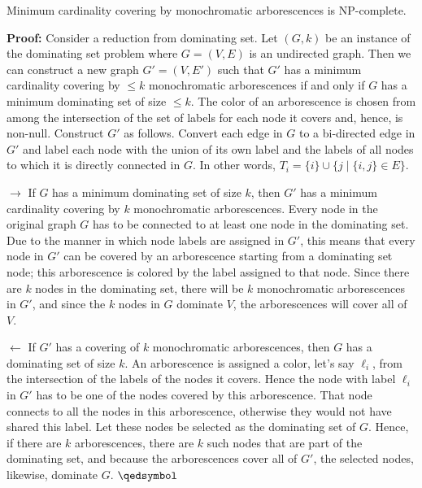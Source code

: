\begin{theorem}
  Minimum cardinality covering by monochromatic arborescences is NP-complete.

\textbf{Proof:} Consider a reduction from dominating set. Let $\left(G, k\right)$ be an instance of the dominating set problem where $G = (V, E)$ is an undirected graph. Then we can construct a new graph $G' = (V, E')$ such that $G'$ has a minimum cardinality covering by $\le k$ monochromatic arborescences if and only if $G$ has a minimum dominating set of size $\le k$. The color of an arborescence is chosen from among the intersection of the set of labels for each node it covers and, hence, is non-null. Construct $G'$ as follows. Convert each edge in $G$ to a bi-directed edge in $G'$ and label each node with the union of its own label and the labels of all nodes to which it is directly connected in $G$. In other words, $T_i = \{i\} \cup \{j \mid \{i,j\} \in E\}$.

$\rightarrow$ If $G$ has a minimum dominating set of size $k$, then $G'$ has a minimum cardinality covering by $k$ monochromatic arborescences. Every node in the original graph $G$ has to be connected to at least one node in the dominating set. Due to the manner in which node labels are assigned in $G'$, this means that every node in $G'$ can be covered by an arborescence starting from a dominating set node; this arborescence is colored by the label assigned to that node. Since there are $k$ nodes in the dominating set, there will be $k$ monochromatic arborescences in $G'$, and since the $k$ nodes in $G$ dominate $V$, the arborescences will cover all of $V$. 

$\leftarrow$ If $G'$ has a covering of $k$ monochromatic arborescences, then $G$ has a dominating set of size $k$. An arborescence is assigned a color, let's say $\ell_i$, from the intersection of the labels of the nodes it covers. Hence the node with label $\ell_i$ in $G'$ has to be one of the nodes covered by this arborescence. That node connects to all the nodes in this arborescence, otherwise they would not have shared this label.  Let these nodes be selected as the dominating set of $G$. Hence, if there are $k$ arborescences, there are $k$ such nodes that are part of the dominating set, and because the arborescences cover all of $G'$, the selected nodes, likewise, dominate $G$.
$\qedsymbol$
\end{theorem}

